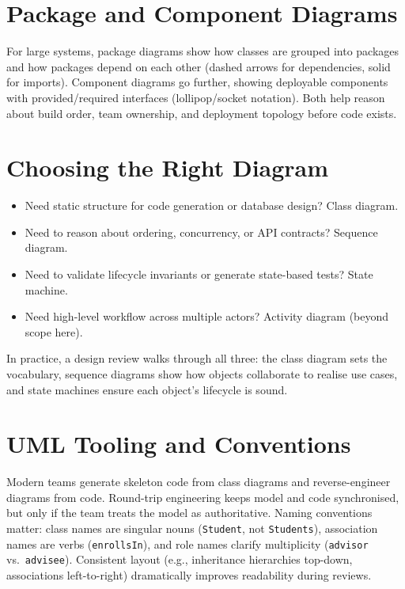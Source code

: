 \section{Package and Component Diagrams}

For large systems, package diagrams show how classes are grouped into packages and how packages depend on each other (dashed arrows for dependencies, solid for imports). Component diagrams go further, showing deployable components with provided/required interfaces (lollipop/socket notation). Both help reason about build order, team ownership, and deployment topology before code exists.

\section{Choosing the Right Diagram}

\begin{itemize}
    \item Need static structure for code generation or database design? Class diagram.
    \item Need to reason about ordering, concurrency, or API contracts? Sequence diagram.
    \item Need to validate lifecycle invariants or generate state-based tests? State machine.
    \item Need high-level workflow across multiple actors? Activity diagram (beyond scope here).
\end{itemize}

In practice, a design review walks through all three: the class diagram sets the vocabulary, sequence diagrams show how objects collaborate to realise use cases, and state machines ensure each object's lifecycle is sound.


\section{UML Tooling and Conventions}

Modern teams generate skeleton code from class diagrams and reverse-engineer diagrams from code. Round-trip engineering keeps model and code synchronised, but only if the team treats the model as authoritative. Naming conventions matter: class names are singular nouns (\texttt{Student}, not \texttt{Students}), association names are verbs (\texttt{enrollsIn}), and role names clarify multiplicity (\texttt{advisor} vs.\ \texttt{advisee}). Consistent layout (e.g., inheritance hierarchies top-down, associations left-to-right) dramatically improves readability during reviews.

